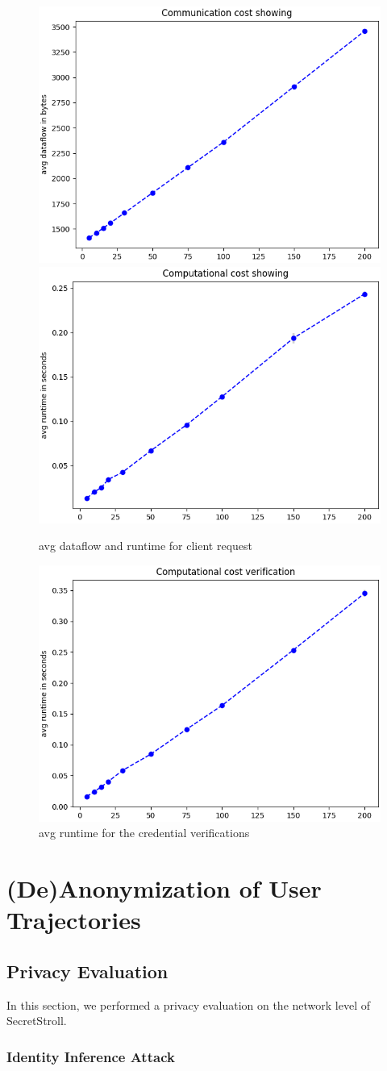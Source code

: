 \documentclass[10pt,conference,compsocconf]{IEEEtran}
\begin{document}
\begin{figure}[h!]
    \includegraphics[width=0.4\linewidth]{../performance_analysis/dataflow_showing.png}
    \includegraphics[width=0.4\linewidth]{../performance_analysis/runtime_showing.png}
    \caption{avg dataflow and runtime for client request}
    \label{fig:showing}
\end{figure}

\begin{figure}[h!]
    \includegraphics[width=0.4\linewidth]{../performance_analysis/runtime_verification}
    \caption{avg runtime for the credential verifications}
    \label{fig:verify}
\end{figure}


\section{(De)Anonymization of User Trajectories}

\subsection{Privacy Evaluation}
In this section, we performed a privacy evaluation on the network level of
SecretStroll.


\subsubsection{Identity Inference Attack}
\end{document}
